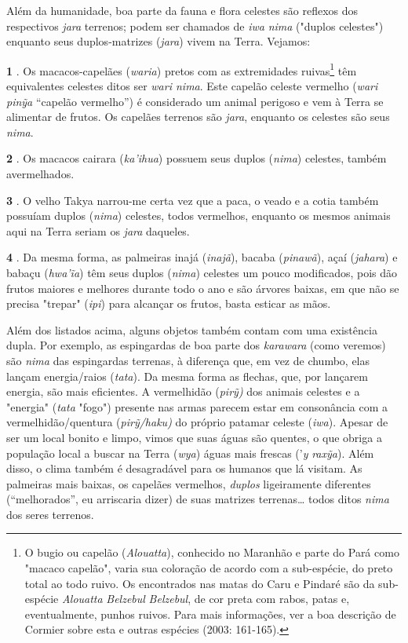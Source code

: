 Além da humanidade, boa parte da fauna e flora celestes são reflexos dos
respectivos \emph{jara} terrenos; podem ser chamados de \emph{iwa}
\emph{nima} ("duplos celestes") enquanto seus duplos-matrizes
(\emph{jara}) vivem na Terra. Vejamos:

\textbf{1} . Os macacos-capelães (\emph{waria}) pretos com as
extremidades ruivas\footnote{O bugio ou capelão (\emph{Alouatta}),
  conhecido no Maranhão e parte do Pará como "macaco capelão", varia sua
  coloração de acordo com a sub-espécie, do preto total ao todo ruivo.
  Os encontrados nas matas do Caru e Pindaré são da sub-espécie
  \emph{Alouatta} \emph{Belzebul} \emph{Belzebul}, de cor preta com
  rabos, patas e, eventualmente, punhos ruivos. Para mais informações,
  ver a boa descrição de Cormier sobre esta e outras espécies (2003:
  161-165).} têm equivalentes celestes ditos ser \emph{wari nima}. Este
capelão celeste vermelho (\emph{wari} \emph{pinỹa} ``capelão vermelho'')
é considerado um animal perigoso e vem à Terra se alimentar de frutos.
Os capelães terrenos são \emph{jara}, enquanto os celestes são seus
\emph{nima}.

\textbf{2} . Os macacos cairara (\emph{ka'ihua}) possuem seus duplos
(\emph{nima}) celestes, também avermelhados.

\textbf{3} . O velho Takya narrou-me certa vez que a paca, o veado e a
cotia também possuíam duplos (\emph{nima}) celestes, todos vermelhos,
enquanto os mesmos animais aqui na Terra seriam os \emph{jara} daqueles.

\textbf{4} . Da mesma forma, as palmeiras inajá (\emph{inajã}), bacaba
(\emph{pinawã}), açaí (\emph{jahara}) e babaçu (\emph{hwa'ĩa}) têm seus
duplos (\emph{nima}) celestes um pouco modificados, pois dão frutos
maiores e melhores durante todo o ano e são árvores baixas, em que não
se precisa "trepar" (\emph{ipi}) para alcançar os frutos, basta esticar
as mãos.

Além dos listados acima, alguns objetos também contam com uma existência
dupla. Por exemplo, as espingardas de boa parte dos \emph{karawara}
(como veremos) são \emph{nima} das espingardas terrenas, à diferença
que, em vez de chumbo, elas lançam energia/raios (\emph{tata}). Da mesma
forma as flechas, que, por lançarem energia, são mais eficientes. A
vermelhidão (\emph{pirỹ)} dos animais celestes e a "energia"
(\emph{tata} "fogo") presente nas armas parecem estar em consonância com
a vermelhidão/quentura (\emph{pirỹ/haku)} do próprio patamar celeste
(\emph{iwa}). Apesar de ser um local bonito e limpo, vimos que suas
águas são quentes, o que obriga a população local a buscar na Terra
(\emph{wya}) águas mais frescas ('\emph{y} \emph{raxỹa}). Além disso, o
clima também é desagradável para os humanos que lá visitam. As palmeiras
mais baixas, os capelães vermelhos, \emph{duplos} ligeiramente
diferentes (``melhorados'', eu arriscaria dizer) de suas matrizes
terrenas\ldots{} todos ditos \emph{nima} dos seres terrenos.

